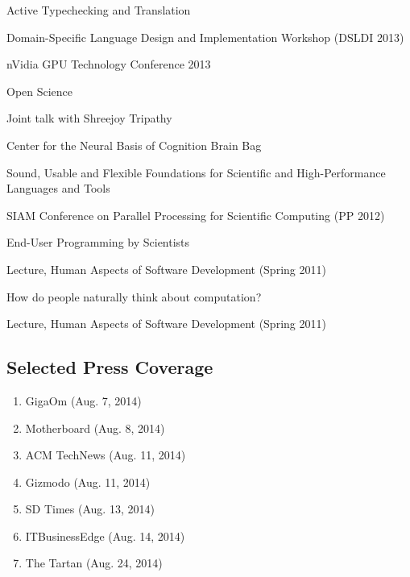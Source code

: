 \documentclass[10pt,letterpaper]{article}
\renewenvironment{itemize}{
  \begin{list}{}{
    \setlength{\leftmargin}{1.5em}
    \setlength{\itemsep}{0.25em}
    \setlength{\parskip}{0pt}
    \setlength{\parsep}{0.25em}
  }
}{
  \end{list}
}
\begin{document}
\begin{enumerate}
  \item Active Typechecking and Translation
    \begin{itemize}
      \item Domain-Specific Language Design and Implementation Workshop (DSLDI 2013)
      \item nVidia GPU Technology Conference 2013
    \end{itemize}
  \item Open Science
    \begin{itemize}
      \item Joint talk with Shreejoy Tripathy
      \item Center for the Neural Basis of Cognition Brain Bag
    \end{itemize}
  \item Sound, Usable and Flexible Foundations for Scientific and High-Performance Languages and Tools 
    \begin{itemize}
      \item SIAM Conference on Parallel Processing for Scientific Computing (PP 2012)
    \end{itemize}
  \item End-User Programming by Scientists
    \begin{itemize}
      \item Lecture, Human Aspects of Software Development (Spring 2011)
    \end{itemize}

  \item How do people naturally think about computation?
    \begin{itemize}
      \item Lecture, Human Aspects of Software Development (Spring 2011)
    \end{itemize}
\end{enumerate}

\subsection*{Selected Press Coverage}
\begin{enumerate}
  \item GigaOm (Aug. 7, 2014)
  \item Motherboard (Aug. 8, 2014)
  \item ACM TechNews (Aug. 11, 2014)
  \item Gizmodo (Aug. 11, 2014)
  \item SD Times (Aug. 13, 2014)
  \item ITBusinessEdge (Aug. 14, 2014)
  \item The Tartan (Aug. 24, 2014)
\end{enumerate}
\end{document}
